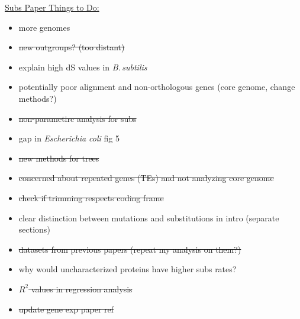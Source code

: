 \documentclass[12pt]{article}
\newcommand{\strep}{\textit{Streptomyces}\xspace}
\newcommand{\bass}{\textit{B.\,subtilis}\xspace}
\newcommand{\ecol}{\textit{E.\,coli}\xspace}
\newcommand{\ecoli}{\textit{Escherichia coli}\xspace}
\newcommand{\pb}{pSymB\xspace}
\begin{document}
\underline{Subs Paper Things to Do:}
\begin{itemize}
	\item  more genomes
	\item \sout{new  outgroups? (too distant)}
	\item explain high dS values in \bass
	\item potentially poor alignment and non-orthologous genes (core genome, change methods?)
	\item \sout{non-parametirc analysis for subs}
	\item gap in \ecoli fig 5
	\item \sout{new methods for trees}
	\item \sout{concerned about repeated genes (TEs) and not analyzing core genome}
	\item \sout{check if trimming respects coding frame}
	\item clear distinction between mutations and substitutions in intro (separate sections)
	\item \sout{datasets from previous papers (repeat my analysis on them?)}
	\item why would uncharacterized proteins have higher subs rates?
	\item \sout{$R^2$ values in regression analysis}
	\item \sout{update gene exp paper ref}
	
%	
%	
%	
%	
%	
%	
%	
%	
%	
%	
%
%	
%	
%	
%	 
	

\end{itemize}
\end{document}
